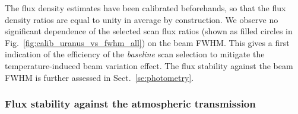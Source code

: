 The flux density estimates have been calibrated beforehands, so that
the flux density ratios are equal to unity in average by construction.
We observe no significant dependence of the selected scan flux ratios
(shown as filled circles in Fig.~\ref{fig:calib_uranus_vs_fwhm_all})
on the beam FWHM. {\lp This gives a first indication of the efficiency
  of the \emph{baseline} scan selection to mitigate the
temperature-induced beam variation effect. The flux stability against
the beam FWHM is further assessed in Sect.~\ref{se:photometry}.}


\subsubsection{Flux stability against the atmospheric transmission}
\label{se:baseline_calibration_atm}

